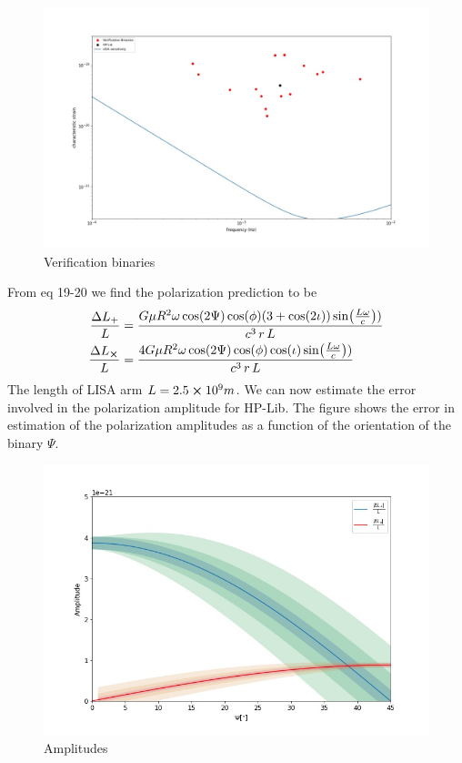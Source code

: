\documentclass[12pt,a4paper,oneside]{book}
\begin{document}
\begin{figure}[!htb]
\centering
\includegraphics[scale=0.3]{../strain_verific_binary.jpg} 
\caption{Verification binaries}
\end{figure}

From eq 19-20 we find the polarization prediction to be
\begin{align}
\frac{\Delta L_{+}}{L} &= \frac{G \mu R^2 \omega \cos(2 \Psi) \cos(\phi) (3 + \cos(2 \iota)) \sin(\frac{L \omega}{c}))}{c^3 \, r \, L}\\
\frac{\Delta L_{\cross}}{L} &= \frac{4 G \mu R^2 \omega \cos(2 \Psi) \cos(\phi) \cos(\iota) \sin(\frac{L \omega}{c}))}{c^3 \, r \, L}\\
\end{align}
The length of LISA arm $L = 2.5 \cross 10^9 m$. We can now estimate the error involved in the polarization amplitude for HP-Lib. The figure shows the error in estimation of the polarization amplitudes as a function of the orientation of the binary $\Psi$.

\begin{figure}[!htb]
\centering
\includegraphics[scale=0.6]{../LISA_ampitude_variation.jpg} 
\caption{Amplitudes}
\end{figure}
\end{document}
